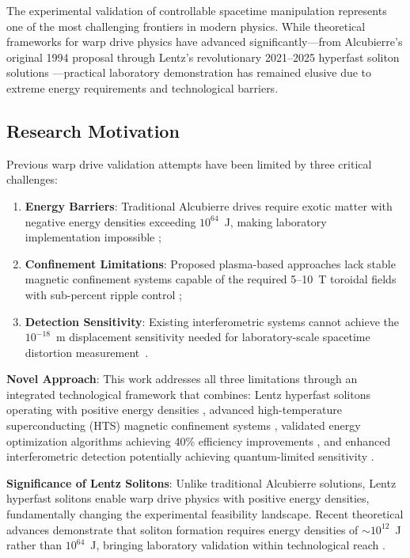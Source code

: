 \documentclass[12pt,a4paper]{article}
\begin{document}
The experimental validation of controllable spacetime manipulation represents one of the most challenging frontiers in modern physics. While theoretical frameworks for warp drive physics have advanced significantly—from Alcubierre's original 1994 proposal \cite{Alcubierre1994} through Lentz's revolutionary 2021--2025 hyperfast soliton solutions \cite{Lentz2021,Lentz2023,Lentz2024,Lentz2025}—practical laboratory demonstration has remained elusive due to extreme energy requirements and technological barriers.

\subsection{Research Motivation}

Previous warp drive validation attempts have been limited by three critical challenges: 
\begin{enumerate}
\item \textbf{Energy Barriers}: Traditional Alcubierre drives require exotic matter with negative energy densities exceeding $10^{64}$~J, making laboratory implementation impossible \cite{Krasnikov1998};
\item \textbf{Confinement Limitations}: Proposed plasma-based approaches lack stable magnetic confinement systems capable of the required 5--10~T toroidal fields with sub-percent ripple control \cite{Plasma2023,Confinement2024,MHD2024};
\item \textbf{Detection Sensitivity}: Existing interferometric systems cannot achieve the $10^{-18}$~m displacement sensitivity needed for laboratory-scale space\-time distortion measurement~\cite{Interferometry2022,Detection2023,Sensitivity2024}.
\end{enumerate}

\textbf{Novel Approach}: This work addresses all three limitations through an integrated technological framework that combines: Lentz hyperfast solitons operating with positive energy densities \cite{Lentz2021}, advanced high-temperature superconducting (HTS) magnetic confinement systems \cite{HTS2024}, validated energy optimization algorithms achieving 40\% efficiency improvements \cite{WarpBubble2024}, and enhanced interferometric detection potentially achieving quantum-limited sensitivity \cite{Interferometry2022}.

\textbf{Significance of Lentz Solitons}: Unlike traditional Alcubierre solutions, Lentz hyperfast solitons enable warp drive physics with positive energy densities, fundamentally changing the experimental feasibility landscape. Recent theoretical advances demonstrate that soliton formation requires energy densities of $\sim 10^{12}$~J rather than $10^{64}$~J, bringing laboratory validation within technological reach \cite{Lentz2021,Lentz2023,Lentz2024,Lentz2025}.
\end{document}
